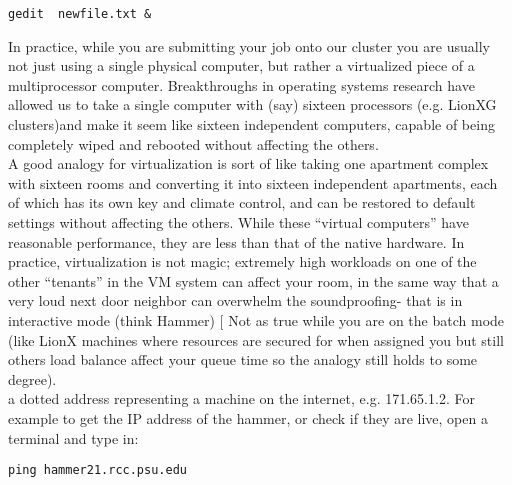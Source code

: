 \documentclass[12pt]{article}
\begin{document}
\begin{lstlisting}[label= gedit,caption= Run gedit on Hammer in the background]
gedit  newfile.txt &
\end{lstlisting}


 In practice, while you are submitting your job onto our cluster you are usually not just using a single physical computer,
but rather a virtualized piece of a multiprocessor computer. Breakthroughs in operating
systems research have allowed us to take a single computer with (say) sixteen processors (e.g. LionXG clusters)and make it seem like sixteen independent computers, capable of being completely wiped
and rebooted without affecting the others.\\
A good analogy for virtualization is sort of like taking one apartment complex with sixteen rooms and
converting it into sixteen independent apartments, each of which has its own key and
climate control, and can be restored to default settings without affecting the others.
While these ``virtual computers'' have reasonable performance, they are less than that of
the native hardware. In practice, virtualization is not magic; extremely high workloads
on one of the other ``tenants'' in the VM system can affect your room, in the same way
that a very loud next door neighbor can overwhelm the soundproofing- that is in interactive mode (think Hammer) [ Not as true while you are on the batch mode (like LionX machines where resources are secured for when assigned you but still others load balance affect your queue time so the analogy still holds to some degree). \\

 a dotted address representing a machine on the internet, e.g. 171.65.1.2. For example to get the IP address of the hammer, or check if they are live, open a terminal and type in:\\
\begin{lstlisting}[label= ping,caption= Run ping on Hammer]
ping hammer21.rcc.psu.edu
\end{lstlisting}
\end{document}
